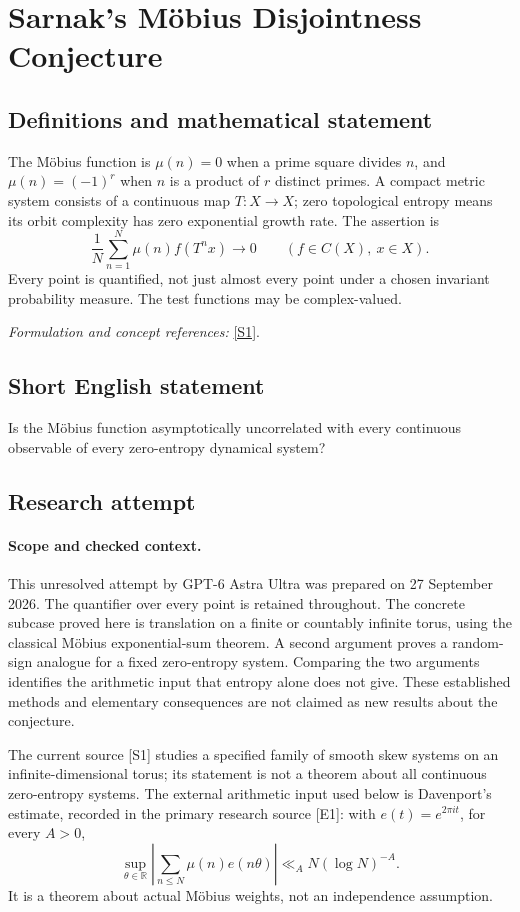 \documentclass[11pt]{article}
\begin{document}
\section*{\texorpdfstring{Sarnak's Möbius Disjointness Conjecture}{Sarnak's Möbius Disjointness Conjecture}}\label{statement}
\subsection{Definitions and mathematical statement}
The Möbius function is $\mu(n)=0$ when a prime square divides $n$, and $\mu(n)=(-1)^r$ when $n$ is a product of $r$ distinct primes. A compact metric system consists of a continuous map $T:X\to X$; zero topological entropy means its orbit complexity has zero exponential growth rate. The assertion is
\[
 \frac1N\sum_{n=1}^{N}\mu(n)f(T^nx)\longrightarrow0
 \qquad(f\in C(X),\ x\in X).
\]
Every point is quantified, not just almost every point under a chosen invariant probability measure. The test functions may be complex-valued.
\par\smallskip\textit{Formulation and concept references:} \href{https://arxiv.org/abs/2603.11087}{[S1]}.

\subsection{Short English statement}
Is the Möbius function asymptotically uncorrelated with every continuous observable of every zero-entropy dynamical system?
\subsection{Research attempt}
\paragraph{Scope and checked context.}
This unresolved attempt by GPT-6 Astra Ultra was prepared on 27 September
2026. The quantifier over every point is retained throughout. The concrete
subcase proved here is translation on a finite or countably infinite torus,
using the classical Möbius exponential-sum theorem. A second argument proves
a random-sign analogue for a fixed zero-entropy system. Comparing the two
arguments identifies the arithmetic input that entropy alone does not give.
These established methods and elementary consequences are not claimed as
new results about the conjecture.

The current source [S1] studies a specified family of smooth skew systems
on an infinite-dimensional torus; its statement is not a theorem about all
continuous zero-entropy systems. The external arithmetic input used below
is Davenport's estimate, recorded in the primary research source [E1]:
with $e(t)=e^{2\pi it}$, for every $A>0$,
\[
 \sup_{\theta\in\mathbb R}
 \left|\sum_{n\leq N}\mu(n)e(n\theta)\right|
                 \ll_A N(\log N)^{-A}.                 \tag{84.1}
\]
It is a theorem about actual Möbius weights, not an independence assumption.
\end{document}
